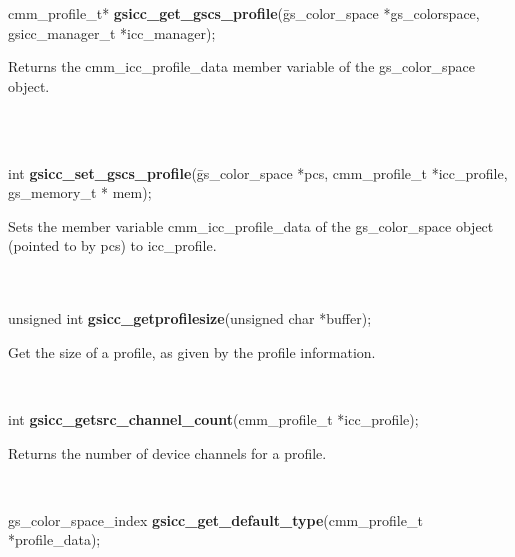 \documentclass[12pt,notitlepage]{article}
\begin{document}
\begin{tabbing}
\noindent cmm\_profile\_t* {\bf gsicc\_get\_gscs\_profile}(\=gs\_color\_space *gs\_colorspace, \\
\> gsicc\_manager\_t *icc\_manager);\\
\end{tabbing}

\begin{minipage}[h]{6.0in}
Returns the cmm\_icc\_profile\_data member variable of the gs\_color\_space object.
\end{minipage}\\
\\

\begin{tabbing}
\noindent int {\bf gsicc\_set\_gscs\_profile}(\=gs\_color\_space *pcs, cmm\_profile\_t *icc\_profile, \\
\> gs\_memory\_t * mem);\\
\end{tabbing}

\begin{minipage}[h]{6.0in}
Sets the member variable cmm\_icc\_profile\_data of the gs\_color\_space object (pointed to by pcs) to icc\_profile.
\end{minipage}\\
\\

\noindent unsigned int {\bf gsicc\_getprofilesize}(unsigned char *buffer);\\

\begin{minipage}[h]{6.0in}
Get the size of a profile, as given by the profile information.
\end{minipage}\\

\begin{tabbing}
\noindent int {\bf gsicc\_getsrc\_channel\_count}(cmm\_profile\_t *icc\_profile);\\
\end{tabbing}

\begin{minipage}[h]{6.0in}
Returns the number of device channels for a profile.
\end{minipage}\\

\begin{tabbing}
\noindent gs\_color\_space\_index {\bf gsicc\_get\_default\_type}(cmm\_profile\_t *profile\_data);\\
\end{tabbing}
\end{document}
